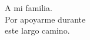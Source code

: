 
\cleardoublepage
\thispagestyle{empty} %

\begin{minipage}[c][\textheight][c]{\textwidth} %
\raggedleft %


A mi familia. \\
Por apoyarme durante\\
este largo camino.

\bigskip

\emph{\tfgauthorname}

\end{minipage}

\blankpage
